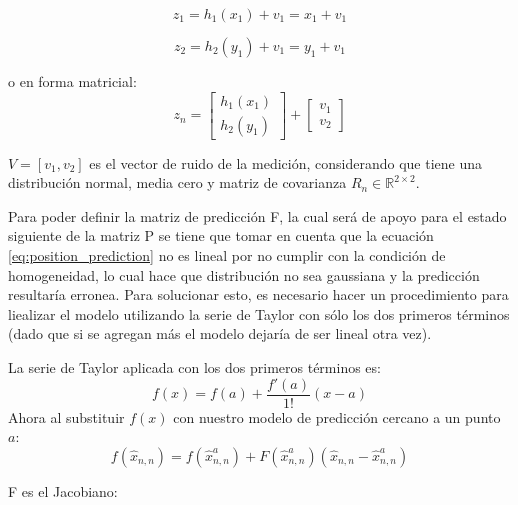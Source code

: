 \begin{equation}
z_1 = h_1(x_1) + v_1 = x_1 + v_1 
\label{eq:x_entry}
\end{equation}

\begin{equation}
z_2 = h_2(y_1) + v_1 = y_1 + v_1 
\label{eq:y_entry}
\end{equation}

o en forma matricial:
\begin{equation}
z_n =
\begin{bmatrix}
h_1(x_1) \\ 
h_2(y_1)
\end{bmatrix}
+
\begin{bmatrix}
v_1 \\ 
v_2
\end{bmatrix}
\end{equation}

$V = [v_1, v_2]$ es el vector de ruido de la medición, considerando que tiene una distribución normal, media cero y matriz de covarianza $R_n\in\mathbb{R}^{2\times 2}$.

Para poder definir la matriz de predicción F, la cual será de apoyo para el estado siguiente de la matriz P se tiene que tomar en cuenta que la ecuación \ref{eq:position_prediction} no es lineal por no cumplir con la condición de homogeneidad, lo cual hace que distribución no sea gaussiana y la predicción resultaría erronea. Para solucionar esto, es necesario hacer un procedimiento para liealizar el modelo utilizando la serie de Taylor con sólo los dos primeros términos (dado que si se agregan más el modelo dejaría de ser lineal otra vez).
	
La serie de Taylor aplicada con los dos primeros términos es:
\begin{equation}
	f(x) = f(a) + \frac{f'(a)}{1!} (x-a)
\end{equation} 
Ahora al substituir $f(x)$ con nuestro modelo de predicción cercano a un punto $a$:
\begin{equation}
	f(\hat{x}_{n,n}) = f(\hat{x}^a_{n,n}) + F(\hat{x}^a_{n,n})(\hat{x}_{n,n} - \hat{x}^a_{n,n})
\end{equation}

F es el Jacobiano:

